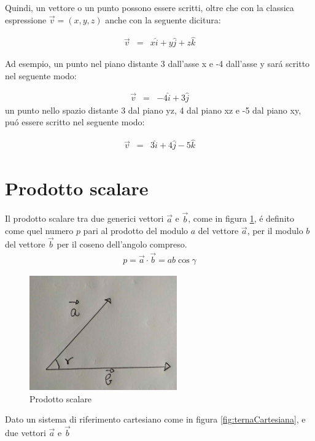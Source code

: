 \documentclass[17pt]{extarticle}
\begin{document}
Quindi, un vettore o un punto possono essere scritti, oltre che con la classica espressione $\vec{v} = (x, y, z)$ anche con la seguente dicitura:

\begin{eqnarray}
	\vec{v} & = & x\hat{i} + y\hat{j} + z\hat{k}
\end{eqnarray}


Ad esempio, un punto nel piano distante 3 dall'asse x e -4 dall'asse y sar\'a scritto nel seguente modo:

\begin{eqnarray}
	\vec{v} & = & -4\hat{i} + 3\hat{j}
\end{eqnarray}
un punto nello spazio distante 3 dal piano yz, 4 dal piano xz e -5 dal piano xy, pu\'o essere scritto nel seguente modo:

\begin{eqnarray}
	\vec{v} & = & 3\hat{i} + 4\hat{j} - 5\hat{k}
\end{eqnarray}


\section{Prodotto scalare}

Il prodotto scalare tra due generici vettori $\vec{a}$ e $\vec{b}$, come in figura \ref{fig:prodScalare}, \'e definito come quel numero $p$ pari al prodotto del modulo $a$ del vettore $\vec{a}$, per il modulo $b$ del vettore $\vec{b}$ per il coseno dell'angolo compreso.
\begin{eqnarray}\label{eq:prodScal}
	p = \vec{a}\cdot\vec{b} = ab\cos\gamma
\end{eqnarray}

\begin{figure}[h]	
	\centering
   	\includegraphics[width=2.5in]{ProdottoScalare.jpg}%
   	\caption{Prodotto scalare}
   	\label{fig:prodScalare}		
\end{figure}

Dato un sistema di riferimento cartesiano come in figura \ref{fig:ternaCartesiana}, e due vettori $\vec{a}$ e $\vec{b}$  
\end{document}
